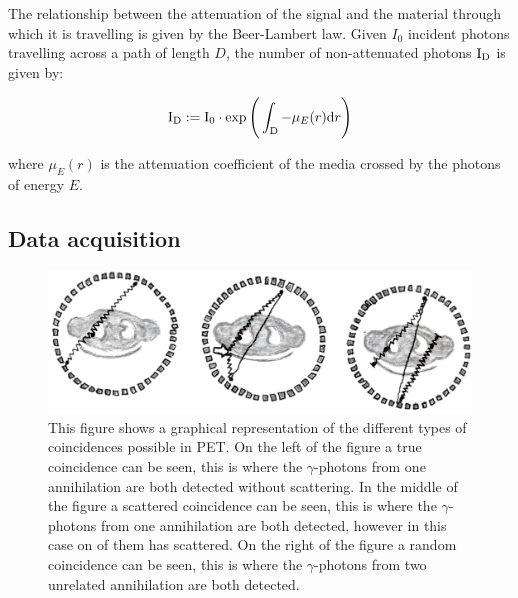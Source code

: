                 The relationship between the attenuation of the signal and the material through which it is travelling is given by the Beer-Lambert law. Given $I_0$ incident photons travelling across a path of length $D$, the number of non-attenuated photons $\mathrm{I}_{\mathrm{D}}$ is given by:
                 
                \begin{equation} \label{sec:eq:beer_lambert_law}
                    \mathrm{I}_{\mathrm{D}} := \mathrm{I}_{0} \cdot \exp\Bigg(\int_{\mathrm{D}} - \mu_E(r)\mathrm{d} r \Bigg)
                \end{equation}

                \noindent where $\mu_E(r)$ is the attenuation coefficient of the media crossed by the photons of energy $E$.
        
        \subsection{Data acquisition} \label{sec:data_acquisition}
            
            \begin{figure}
                \centering
                
                \includegraphics[width=1.0\linewidth]{figures/background_coincidence.png}
                
                \captionsetup{singlelinecheck=false, justification=raggedright}
                \caption{This figure shows a graphical representation of the different types of coincidences possible in \gls{PET}. On the left of the figure a true coincidence can be seen, this is where the $\gamma$-photons from one annihilation are both detected without scattering. In the middle of the figure a scattered coincidence can be seen, this is where the $\gamma$-photons from one annihilation are both detected, however in this case on of them has scattered. On the right of the figure a random coincidence can be seen, this is where the $\gamma$-photons from two unrelated annihilation are both detected.} \label{fig:data_acquisition_coincidence}
            \end{figure}
            
